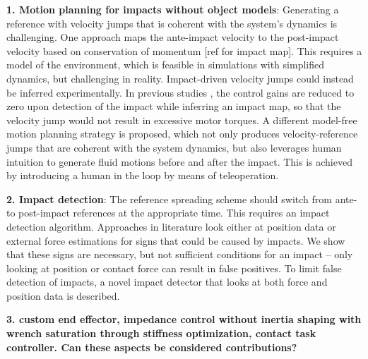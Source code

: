 \documentclass[a4paper, 10pt, conference]{ieeeconf}
\begin{document}
    \textbf{1. Motion planning for impacts without object models}: Generating a reference with velocity jumps that is coherent with the system’s dynamics is challenging. 
    One approach maps the ante-impact velocity to the post-impact velocity based on conservation of momentum [ref for impact map]. This requires a model of the environment, which is feasible in simulations with simplified dynamics, but challenging in reality.
    Impact-driven velocity jumps could instead be inferred experimentally. In previous studies \cite{aouajPredictingPostImpactVelocity2021}, the control gains are reduced to zero upon detection of the impact while inferring an impact map, so that the velocity jump would not result in excessive motor torques.
    A different model-free motion planning strategy is proposed, which not only produces velocity-reference jumps that are coherent with the system dynamics, but also leverages human intuition to generate fluid motions before and after the impact. This is achieved by introducing a human in the loop by means of teleoperation. %

    \textbf{2. Impact detection}: The reference spreading scheme should switch from ante- to post-impact references at the appropriate time. This requires an impact detection algorithm. Approaches in literature look either at position data \cite{rijnenMotionSignalsVelocity2018} or external force estimations \cite{uitendaalTeachingRobotsInteraction2022,properAimAwareCollisionMonitoring2021,properValidationNumericalSimultaneous2022} for signs that could be caused by impacts. We show that these signs are necessary, but not sufficient conditions for an impact -- only looking at position or contact force can result in false positives. To limit false detection of impacts, a novel impact detector that looks at both force and position data is described.

    \textbf{3. custom end effector, impedance control without inertia shaping with wrench saturation through stiffness optimization, contact task controller. Can these aspects be considered contributions?}
\end{document}
